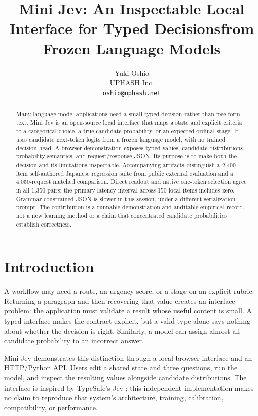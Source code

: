 \documentclass[11pt]{article}
\title{Mini Jev: An Inspectable Local Interface for Typed Decisions\newline from Frozen Language Models}
\author{Yuki Oshio \\
  UPHASH Inc. \\
  \texttt{oshio@uphash.net}}
\newcommand{\system}{Mini Jev}
\begin{document}
\maketitle

\begin{abstract}
Many language-model applications need a small typed decision rather than free-form text. \system{} is an open-source local interface that maps a state and explicit criteria to a categorical choice, a true-candidate probability, or an expected ordinal stage. It uses candidate next-token logits from a frozen language model, with no trained decision head. A browser demonstration exposes typed values, candidate distributions, probability semantics, and request/response JSON. Its purpose is to make both the decision and its limitations inspectable. Accompanying artifacts distinguish a 2,400-item self-authored Japanese regression suite from public external evaluation and a 4,050-request matched comparison. Direct readout and native one-token selection agree in all 1,350 pairs; the primary latency interval across 150 local items includes zero. Grammar-constrained JSON is slower in this session, under a different serialization prompt. The contribution is a runnable demonstration and auditable empirical record, not a new learning method or a claim that concentrated candidate probabilities establish correctness.
\end{abstract}

\section{Introduction}
A workflow may need a route, an urgency score, or a stage on an explicit rubric. Returning a paragraph and then recovering that value creates an interface problem: the application must validate a result whose useful content is small. A typed interface makes the contract explicit, but a valid type alone says nothing about whether the decision is right. Similarly, a model can assign almost all candidate probability to an incorrect answer.

\system{} demonstrates this distinction through a local browser interface and an HTTP/Python API. Users edit a shared state and three questions, run the model, and inspect the resulting values alongside candidate distributions. The interface is inspired by TypeSafe's Jev \citep{typesafe2026jev,typesafeapi}; this independent implementation makes no claim to reproduce that system's architecture, training, calibration, compatibility, or performance.
\end{document}
